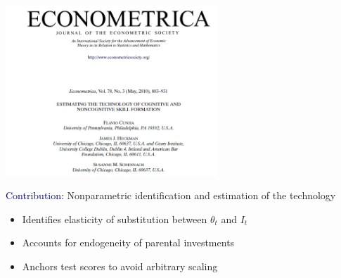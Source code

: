 \documentclass[aspectratio=169]{beamer}
\begin{document}
\begin{frame}
\centering
\includegraphics[width=0.6\textwidth]{CHS_2010_Econometrica_cover.jpg}
\end{frame}

\begin{frame}
\textcolor{navy}{Contribution:} Nonparametric identification and estimation of the technology
\bigskip

\begin{itemize}
\itemsep1.5em
\item<2-> Identifies elasticity of substitution between $\theta_t$ and $I_t$
\item<3-> Accounts for endogeneity of parental investments
\item<4-> Anchors test scores to avoid arbitrary scaling
\end{itemize}

\end{frame}
\end{document}
